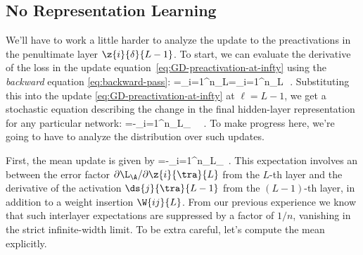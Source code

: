 \subsection{No Representation Learning}\label{subsec:GD_no_RL_at_infinity}
We'll have to work a little harder to analyze the update to the preactivations in the penultimate layer $\z{i}{\delta}{L-1}$. To start, we can evaluate the derivative of the loss in the update equation~\eqref{eq:GD-preactivation-at-infty} using the \emph{backward} equation \eqref{eq:backward-pass}:
\be
{}=\sum_{i=1}^{n_{L}}=\sum_{i=1}^{n_{L}}\,\, .
\ee
Substituting this into the update \eqref{eq:GD-preactivation-at-infty} at $\ell = L-1$, we get a stochastic equation describing the change in the final hidden-layer representation for any particular network:
\be\label{eq:stochastic-penultimate-update}
=-\eta\sum_{i=1}^{n_{L}}\sum_{\tra\in\A} \, \, .
\ee 
To make progress here, we're going to have to analyze the distribution over such updates.

First, the mean update is given by
\be\label{eq:expected-move-penultimate-infty-intermediate}
=-\eta\sum_{i=1}^{n_{L}}\sum_{\tra\in\A}\, .
\ee
This expectation involves an  between the error factor $\partial \L_\A/\partial \z{i}{\tra}{L}$ 
from the $L$-th layer and the derivative of the activation $\ds{j}{\tra}{L-1}$ from the $(L-1)$-th layer, in addition to a weight insertion $\W{ij}{L}$. From our previous experience we know that such interlayer expectations are suppressed by a factor of $1/n$, vanishing in the strict infinite-width limit. To be extra careful,
 let's compute the mean explicitly.




